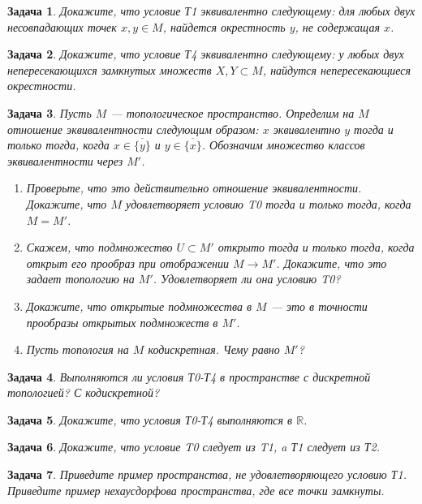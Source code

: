 \documentclass[12pt]{book}
\def\R{{\mathbb R}}
\theoremstyle{upshape}
\newtheorem{zadacha}{Задача}[chapter]
\theoremstyle{generic}
\theoremstyle{upshapenonumber}
\newcommand{\следствие}{%
     \refstepcounter{teorema}
     {\noindent\bf Следствие \thechapter.\arabic{teorema}:\ }}
\newcommand{\пример}{%
     \refstepcounter{teorema}
     {\noindent\bf Пример \thechapter.\arabic{teorema}:\ }}
\newcommand{\лемма}{%
     \refstepcounter{teorema}
     {\noindent\bf Лемма \thechapter.\arabic{teorema}:\ }}
\newcommand{\теорема}{%
     \refstepcounter{teorema}
     {\noindent\bf Теорема \thechapter.\arabic{teorema}:\ }}
\newcommand{\утверждение}{%
     \refstepcounter{teorema}
     {\noindent\bf Утверждение \thechapter.\arabic{teorema}:\ }}
\def\ит{\it}
\def\итем{\item %
}
\begin{document}
{\begin{zadacha}
Докажите, что условие Т1 эквивалентно следующему: для любых двух
несовпадающих точек $x, y\in M$, найдется окрестность $y$, не
содержащая $x$.
\end{zadacha}

\begin{zadacha}
Докажите, что условие Т4 эквивалентно следующему: 
 у любых двух
непересекающихся замкнутых множеств $X, Y\subset M$, найдутся
непересекающиеся окрестности.
\end{zadacha}


\begin{zadacha} Пусть $M$ --- топологическое пространство. Определим
  на $M$ отношение эквивалентности следующим образом: $x$
  эквивалентно $y$ тогда и только тогда, когда $x \in
  \overline{\{y\}}$ и $y \in \overline{\{x\}}$. Обозначим множество
  классов эквивалентности через $M'$.
\begin{enumerate}
\итем Проверьте, что это действительно отношение эквивалентности.
Докажите, что $M$ удовлетворяет условию T0 тогда и только тогда,
когда $M=M'$.

\итем Скажем, что подмножество $U \subset M'$ открыто тогда и только
тогда, когда открыт его прообраз при отображении $M \to
M'$. Докажите, что это задает топологию на $M'$. Удовлетворяет ли
она условию T0?

\итем Докажите, что открытые подмножества в $M$ --- это в точности
  прообразы открытых подмножеств в $M'$.

\итем Пусть топология на $M$ кодискретная. Чему равно $M'$?
\end{enumerate}
\end{zadacha}

\begin{zadacha}
Выполняются ли условия Т0-Т4 в пространстве с дискретной топологией?
С кодискретной?
\end{zadacha}

\begin{zadacha}
Докажите, что условия Т0-Т4 выполняются в $\R$.
\end{zadacha}

\begin{zadacha}
Докажите, что условие T0 следует из T1, a Т1 следует из Т2.
\end{zadacha}

\begin{zadacha} 
Приведите пример пространства, не удовлетворяющего условию
Т1. Приведите пример нехаусдорфова пространства, где все точки
замкнуты.
\end{zadacha}

}
\end{document}
